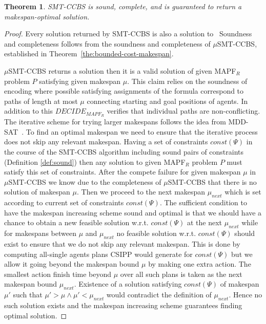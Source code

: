 \documentclass[review]{elsarticle}
\newtheorem{theorem}{Theorem}
\newcommand{\decidemapfr}{\ensuremath{\mathit{DECIDE_{MAPF_R}}}\xspace}
\newcommand{\mapfr}{\ac{MAPF}$_R$\xspace}
\newcommand{\mddsat}{MDD-SAT\xspace}
\newcommand{\smtccbs}{SMT-CCBS\xspace}
\newcommand{\musmtccbs}{\ensuremath{\mu}SMT-CCBS\xspace}
\newcommand{\const}{\textit{const}\xspace}
\begin{document}
\begin{theorem}
\smtccbs is sound, complete, and is guaranteed to return a makespan-optimal solution. 
\label{the:optimal-makespan}
\end{theorem}
\begin{proof}
Every solution returned by \smtccbs is also a solution to \
Soundness and completeness follows from the soundness and completeness of \musmtccbs, established in Theorem~\ref{the:bounded-cost-makespan}.

\musmtccbs returns a solution then it is a valid solution of given \mapfr problem $P$ satisfying given makespan $\mu$. This claim relies on the soundness of encoding where possible satisfying assignments of the formula correspond to paths of length at most $\mu$ connecting starting and goal positions of agents. In addition to this \decidemapfr verifies that individual paths are non-conflicting.
The iterative scheme for trying larger makespans follows the idea from \mddsat~\cite{DBLP:conf/ecai/SurynekFSB16}. To find an optimal makespan we need to ensure that the iterative process does not skip any relevant makespan. Having a set of constraints $\const(\Psi)$ in the course of the \smtccbs algorithm including sound pairs of constraints (Definition \ref{def:sound}) then any solution to given \mapfr problem $P$ must satisfy this set of constraints. After the compete failure for given makespan $\mu$ in $\mu$\smtccbs we know due to the completeness of \musmtccbs that there is no solution of makespan $\mu$. Then we proceed to the next makespan $\mu_{next}$ which is set according to current set of constraints $\const(\Psi)$.
The sufficient condition to have the makespan increasing scheme sound and optimal is that we should have a chance to obtain a new feasible solution w.r.t. $\const(\Psi)$ at the next $\mu_{next}$ while for makespans between $\mu$ and $\mu_{next}$ no feasible solution w.r.t. $\const(\Psi)$ should exist to ensure that we do not skip any relevant makespan. This is done by computing all-single agents plans CSIPP would generate for $\const(\Psi)$ but we allow it going beyond the makespan bound $\mu$ by making one extra action. The smallest action finish time beyond $\mu$ over all such plans is taken as the next makespan bound $\mu_{next}$. Existence of a solution satisfying $\const(\Psi)$ of makespan $\mu'$ such that $\mu' > \mu \wedge \mu' < \mu_{next}$ would contradict the definition of $\mu_{next}$. Hence no such solution exists and the makespan increasing scheme guarantees finding optimal solution. %

\end{proof}
\end{document}
